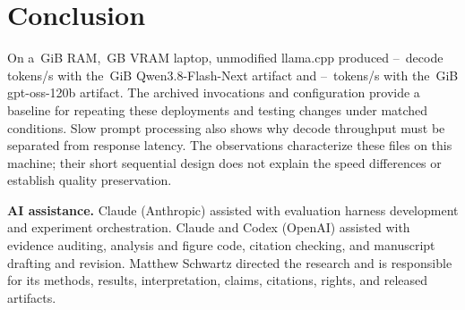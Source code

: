 \documentclass[11pt]{article}
\begin{document}
\section{Conclusion}

On a \PthreeCpuRamGiB\,GiB RAM, \PthreeGpuMarketedVramGB\,GB VRAM laptop,
unmodified llama.cpp produced
\PthreeFlashInitialGenOne--\PthreeFlashQuietGenOne\ decode tokens/s with the
\PthreeFlashFileGiB\,GiB Qwen3.8-Flash-Next artifact and
\PthreeGptOssInitialGenTwo--\PthreeGptOssInitialGenOne\ tokens/s with the
\PthreeGptOssFileGiB\,GiB gpt-oss-120b artifact. The archived invocations and
configuration provide a baseline for repeating these deployments and testing
changes under matched conditions. Slow prompt processing also shows why
decode throughput must be separated from response latency. The observations
characterize these files on this machine; their short sequential design does
not explain the speed differences or establish quality preservation.

\medskip
\noindent\textbf{AI assistance.} Claude (Anthropic) assisted with evaluation
harness development and experiment orchestration. Claude and Codex (OpenAI)
assisted with evidence auditing, analysis and figure code, citation checking,
and manuscript drafting and revision. Matthew Schwartz directed the research
and is responsible for its methods, results, interpretation, claims,
citations, rights, and released artifacts.



\end{document}
